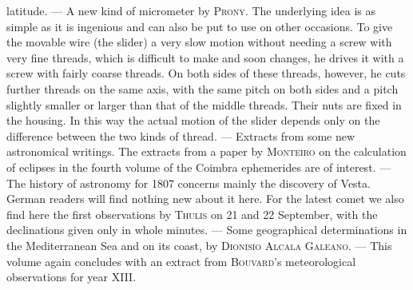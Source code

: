  latitude. --- A new kind of micrometer by \textsc{Prony}. The underlying idea is as simple as it is ingenious and can also be put to use on other occasions. To give the movable wire (the slider) a very slow motion without needing a screw with very fine threads, which is difficult to make and soon changes, he drives it with a screw with fairly coarse threads. On both sides of these threads, however, he cuts further threads on the same axis, with the same pitch on both sides and a pitch slightly smaller or larger than that of the middle threads. Their nuts are fixed in the housing. In this way the actual motion of the slider depends only on the difference between the two kinds of thread. --- Extracts from some new astronomical writings. The extracts from a paper by \textsc{Monteiro} on the calculation of eclipses in the fourth volume of the Coimbra ephemerides are of interest. --- The history of astronomy for 1807 concerns mainly the discovery of Vesta. German readers will find nothing new about it here. For the latest comet we also find here the first observations by \textsc{Thulis} on 21 and 22 September, with the declinations given only in whole minutes. --- Some geographical determinations in the Mediterranean Sea and on its coast, by \textsc{Dionisio Alcala Galeano}. --- This volume again concludes with an extract from \textsc{Bouvard}’s meteorological observations for year XIII.
